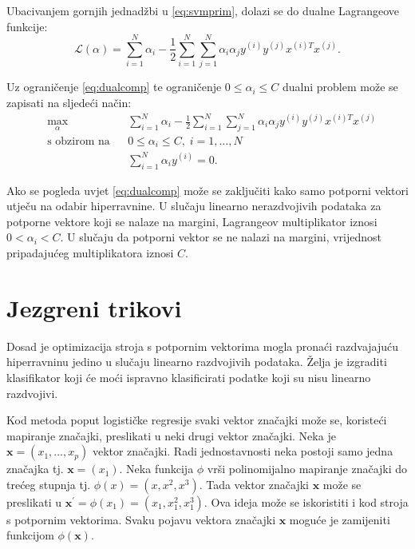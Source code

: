 \documentclass[times, utf8, zavrsni, numeric]{fer}
\begin{document}
Ubacivanjem gornjih jednadžbi u \ref{eq:svmprim}, dolazi se do dualne Lagrangeove funkcije:
\begin{equation} \label{eq:svmdual}
  \mathcal{L}(\alpha) = \sum_{i=1}^{N} \alpha_i - 
  \frac{1}{2}\sum_{i=1}^{N}\sum_{j=1}^{N} \alpha_i\alpha_jy^{(i)}y^{(j)}x^{(i)T}x^{(j)}.
\end{equation}

Uz ograničenje \ref{eq:dualcomp} te ograničenje $0 \leq \alpha_i \leq C$ dualni problem može se zapisati
na sljedeći način:
\begin{equation}
\begin{aligned}
& \underset{\alpha}{\text{max}}
& & \sum_{i=1}^{N} \alpha_i - 
  \frac{1}{2}\sum_{i=1}^{N}\sum_{j=1}^{N} \alpha_i\alpha_jy^{(i)}y^{(j)}x^{(i)T}x^{(j)}\\
& \text{s obzirom na}
& & 0 \leq \alpha_i \leq C, \; i = 1, \ldots, N \\
&&& \sum_{i=1}^{N} \alpha_iy^{(i)} = 0.
\end{aligned}
\end{equation}

Ako se pogleda uvjet \ref{eq:dualcomp} može se zaključiti kako samo potporni vektori utječu na
odabir hiperravnine. U slučaju linearno nerazdvojivih podataka za potporne vektore koji se nalaze
na margini, Lagrangeov multiplikator iznosi $0 < \alpha_i < C$. U slučaju da potporni vektor se ne
nalazi na margini, vrijednost pripadajućeg multiplikatora iznosi $C$.

\section{Jezgreni trikovi} \label{jezgra}
Dosad je optimizacija stroja s potpornim vektorima mogla pronaći razdvajajuću hiperravninu jedino u
slučaju linearno razdvojivih podataka. 
Želja je izgraditi klasifikator koji će moći ispravno klasificirati podatke koji su nisu linearno 
razdvojivi.

\par Kod metoda poput logističke regresije svaki vektor značajki može se, koristeći mapiranje značajki,
preslikati u neki drugi vektor značajki.
Neka je $\mathbf{x}=(x_1, \ldots, x_p)$ vektor značajki. 
Radi jednostavnosti neka postoji samo jedna značajka tj. $\mathbf{x} = (x_1)$.
Neka funkcija $\phi$ vrši polinomijalno mapiranje značajki do trećeg stupnja tj. 
$\phi(x) = (x, x^2, x^3)$. 
Tada vektor značajki $\mathbf{x}$ može se preslikati u 
$\mathbf{x}^{'} = \phi(x_1) = (x_1, x_1^2, x_1^3)$.
Ova ideja može se iskoristiti i kod stroja s potpornim vektorima.
Svaku pojavu vektora značajki $\mathbf{x}$ moguće je zamijeniti funkcijom $\phi(\mathbf{x})$.
\end{document}
